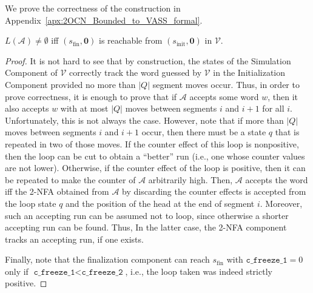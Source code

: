 \documentclass[USenglish]{lipics-v2021}
\renewcommand{\vec}[1]{\boldsymbol{#1}}
\newcommand{\vf}[1]{\texttt{#1}}
\newcommand{\cA}{\mathcal{A}}
\newcommand{\cV}{\mathcal{V}}
\begin{document}
We prove the correctness of the construction in Appendix~\ref{apx:2OCN_Bounded_to_VASS_formal}.
\begin{lemma}
\label{lem:correctness_Bounded_2OCN_to_VASS} $L(\cA)\neq \emptyset$ iff
$(s_{\textrm{fin}},\vec{0})$ is reachable from $(s_{\textrm{init}},\vec{0})$
in $\cV$.
\end{lemma}
\begin{proof}
It is not hard to see that by construction, the states of the Simulation
Component of $\cV$ correctly track the word guessed by $\cV$ in the
Initialization Component provided no more than $|Q|$ segment moves occur.
Thus, in order to prove correctness, it is enough to prove that if $\cA$
accepts some word $w$, then it also accepts $w$ with at most $|Q|$ moves
between segments $i$ and $i+1$ for all $i$.  Unfortunately, this is not
always the case.  However, note that if more than $|Q|$ moves between
segments $i$ and $i+1$ occur, then there must be a state $q$ that is
repeated in two of those moves. If the counter effect of this loop is
nonpositive, then the loop can be cut to obtain a ``better'' run (i.e., one
whose counter values are not lower).  Otherwise, if the counter effect of
the loop is positive, then it can be repeated to make the counter of $\cA$
arbitrarily high.  Then, $\cA$ accepts the word iff the 2-NFA obtained from
$\cA$ by discarding the counter effects is accepted from the loop state $q$
and the position of the head at the end of segment $i$. Moreover, such an
accepting run can be assumed not to loop, since otherwise a shorter
accepting run can be found.  Thus, In the latter case, the 2-NFA component
tracks an accepting run, if one exists.

Finally, note that the finalization component can reach $s_{\textrm{fin}}$
with $\vf{c\_freeze\_1}=0$ only if $\vf{c\_freeze\_1}<\vf{c\_freeze\_2}$,
i.e., the loop taken was indeed strictly positive.
\end{proof}

\end{document}
